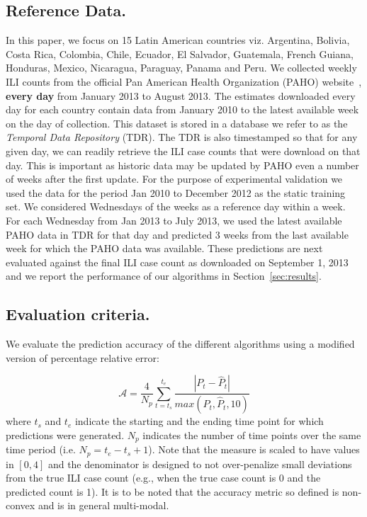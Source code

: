 
\subsection{Reference Data.}
In this paper, we focus on 15 Latin
American countries viz. Argentina, Bolivia, Costa Rica, Colombia, Chile,
Ecuador,  El Salvador, Guatemala, French Guiana, Honduras, Mexico, Nicaragua,
Paraguay, Panama and Peru. We collected weekly ILI counts
from the official Pan American Health Organization (PAHO)
website~\cite{PAHO:2013}, {\bf every day} from January 2013 to August 2013. The
estimates downloaded every day for each country contain data from January 2010 to the latest
available week on the day of collection. 
This dataset is stored in a database we refer to as
the {\it Temporal Data Repository} (TDR).  The TDR is also timestamped so that for
any given day, we can readily retrieve the ILI case
counts that were download on that day. This is important as historic data may be updated by
PAHO even a number of weeks after the first update.  For the purpose of experimental validation
we used the data for the period Jan 2010 to December 2012 as the static
training set. We considered Wednesdays of the weeks as a reference day within a week.  For
each Wednesday from Jan 2013 to July 2013, we used the latest available PAHO
data in TDR for that day and predicted 3 weeks from the last available week for
which the PAHO data was available. These predictions are next evaluated against
the final ILI case count as downloaded on September 1, 2013 and we report the
performance of our algorithms in Section~\ref{sec:results}. 

\subsection{Evaluation criteria.}
We evaluate the prediction accuracy of the
different algorithms using a modified version of percentage relative error:

\begin{equation} 
    \label{eq:def:accuracy} 
    \mathcal{A} = \frac{4}{N_p}\sum \limits_{t=t_s}^{t_e}\frac{|P_t -\hat{P}_t| }{max(P_t, \hat{P}_t, 10)}
\end{equation} 
where $t_s$ and $t_e$ indicate the starting and the ending
time point for which predictions were generated.  $N_p$ indicates the number of
time points over the same time period (i.e. $N_p = t_e - t_s + 1$). Note that
the measure is scaled to have values in $[0,4]$ and the denominator is
designed to not over-penalize small deviations from the true ILI case count (e.g., when
the true case count is 0 and the predicted count is 1).
It is to be noted that the accuracy metric so defined is
non-convex and is in general multi-modal. 


